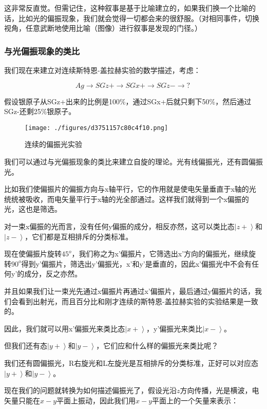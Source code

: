 这非常反直觉。但需记住，这种叙事是基于比喻建立的，如果我们换一个比喻的话，比如光的偏振现象，我们就会觉得一切都会来的很舒服。（对相同事件，切换视角，任意武断地使用比喻（图像）进行叙事是发现的门径。）

\subsubsection{与光偏振现象的类比}

我们现在来建立对连续斯特恩-盖拉赫实验的数学描述，考虑：

\begin{equation}
Ag \to SGz+ \to SGx+ \to SGz- \to ?~
\end{equation}

假设银原子从SGz+出来的比例是100\%，通过SGx+后就只剩下50\%，然后通过SGz-还剩25\%银原子。

\begin{figure}[ht]
\centering
\texttt{[image: ./figures/d3751157c80c4f10.png]}
\caption{连续的偏振光实验} \label{fig_QMPre2_24}
\end{figure}

我们可以通过与光偏振现象的类比来建立自旋的理论。光有线偏振光，还有圆偏振光。

比如我们使偏振片的偏振方向与x轴平行，它的作用就是使电矢量垂直于x轴的光统统被吸收，而电矢量平行于x轴的光全部通过。这样我们就得到一个x偏振的光，这也是筛选。

对一束x偏振的光而言，没有任何y偏振的成分，相反亦然，这可以类比态$\left|z+ \right\rangle $和$\left| z- \right\rangle$，它们都是互相排斥的分类标准。

现在使偏振片旋转$45^o$，我们称之为x'偏振片，它筛选出x'方向的偏振光，继续旋转$90^o$得到y'偏振片，筛选出y'偏振光，x'和y'是垂直的，因此x'偏振光中不会有任何y'的成分，反之亦然。

并且如果我们让一束光先通过x偏振片再通过x'偏振片，最后通过y偏振片的话，我们会看到出射光，而且百分比和刚才连续的斯特恩-盖拉赫实验的实验结果是一致的。

因此，我们就可以用x'偏振光来类比态$\left|x+ \right\rangle$，y'偏振光来类比$\left|x- \right\rangle$。

但我们还有态$\left| y+ \right\rangle$和$\left| y- \right\rangle$，它们应和什么样的偏振光来类比呢？

我们还有圆偏振光，R右旋光和L左旋光是互相排斥的分类标准，正好可以对应态$\left| y+ \right\rangle$和$\left| y- \right\rangle$。

现在我们的问题就转换为如何描述偏振光了，假设光沿$z$方向传播，光是横波，电矢量只能在$x-y$平面上振动，因此我们用$x-y$平面上的一个矢量来表示：

